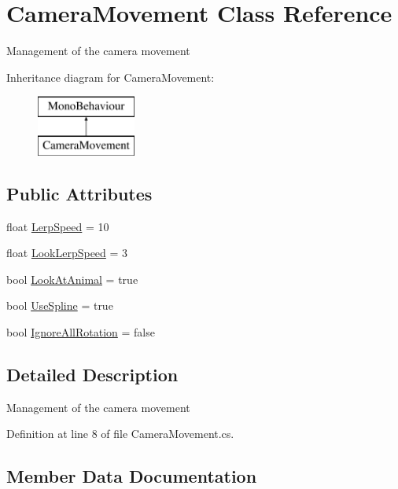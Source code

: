\hypertarget{class_camera_movement}{}\section{Camera\+Movement Class Reference}
\label{class_camera_movement}


Management of the camera movement  


Inheritance diagram for Camera\+Movement\+:\begin{figure}[H]
\begin{center}
\leavevmode
\includegraphics[height=2.000000cm]{class_camera_movement}
\end{center}
\end{figure}
\subsection*{Public Attributes}
\begin{DoxyCompactItemize}
\item 
float \mbox{\hyperlink{class_camera_movement_a384ba60cc3c7882ca87a111d5ac583fd}{Lerp\+Speed}} = 10
\item 
float \mbox{\hyperlink{class_camera_movement_ad6d5e5470aacd6a67cc06cd1df7a0f78}{Look\+Lerp\+Speed}} = 3
\item 
bool \mbox{\hyperlink{class_camera_movement_a7b0a25043de0fa965caa13a65b6cbaa0}{Look\+At\+Animal}} = true
\item 
bool \mbox{\hyperlink{class_camera_movement_a0989aa3b78a8de043c986ad31df204d0}{Use\+Spline}} = true
\item 
bool \mbox{\hyperlink{class_camera_movement_a5af9fc8df90f90095c1653bb016fa8ac}{Ignore\+All\+Rotation}} = false
\end{DoxyCompactItemize}


\subsection{Detailed Description}
Management of the camera movement 



Definition at line 8 of file Camera\+Movement.\+cs.



\subsection{Member Data Documentation}
\mbox{\label{class_camera_movement_a5af9fc8df90f90095c1653bb016fa8ac}} 
